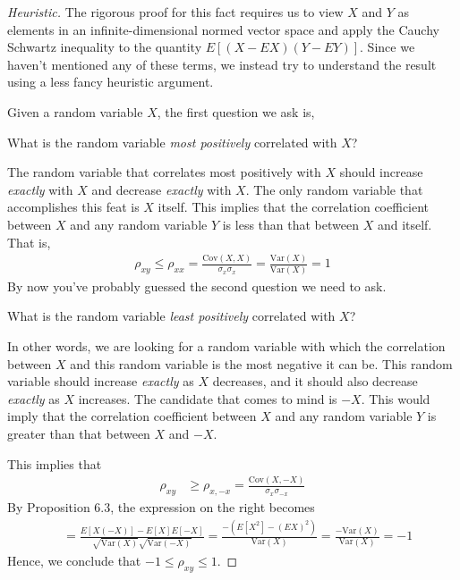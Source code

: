 \documentclass[11pt,letterpaper]{article}
\newcommand\var{\text{Var}}
\newcommand\cov{\text{Cov}}
\numberwithin{theorem}{section}
\numberwithin{definition}{section}
\numberwithin{lemma}{section}
\numberwithin{corollary}{section}
\numberwithin{proposition}{section}
\theoremstyle{definition}
\numberwithin{remark}{section}
\numberwithin{claim}{section}
\numberwithin{observation}{section}
\numberwithin{fact}{section}
\numberwithin{assumption}{section}
\numberwithin{example}{section}
\numberwithin{exercise}{section}
\begin{document}
\begin{proof}[Heuristic]
The rigorous proof for this fact requires us to view $X$ and $Y$ as elements in an infinite-dimensional normed vector space and apply the Cauchy Schwartz inequality to the quantity $E[(X-EX)(Y-EY)]$. Since we haven't mentioned any of these terms, we instead try to understand the result using a less fancy heuristic argument.

Given a random variable $X$, the first question we ask is, 
\begin{center}
What is the random variable \textit{most positively} correlated with $X$?
\end{center}
The random variable that correlates most positively with $X$ should increase \textit{exactly} with $X$ and decrease \textit{exactly} with $X$. The only random variable that accomplishes this feat is $X$ itself. This implies that the correlation coefficient between $X$ and any random variable $Y$ is less than that between $X$ and itself. That is,
\begin{align*}
\rho_{xy} \leq \rho_{xx} = \frac{\cov(X,X)}{\sigma_x \sigma_x} = \frac{\var(X)}{\var(X)} = 1
\end{align*}
By now you've probably guessed the second question we need to ask.
\begin{center}
What is the random variable \textit{least positively} correlated with $X$?
\end{center}
In other words, we are looking for a random variable with which the correlation between $X$ and this random variable is the most negative it can be. This random variable should increase \textit{exactly} as $X$ decreases, and it should also decrease \textit{exactly} as $X$ increases. The candidate that comes to mind is $-X$. This would imply that the correlation coefficient between $X$ and any random variable $Y$ is greater than that between $X$ and $-X$.

This implies that
\begin{align*}
\rho_{xy} &\geq \rho_{x,-x} = \frac{\cov(X,-X)}{\sigma_x \sigma_{-x}} 
\end{align*}
By Proposition 6.3, the expression on the right becomes
\begin{align*}
&= \frac{E[X(-X)] - E[X]E[-X]}{\sqrt{\var(X)} \sqrt{\var(-X)}} = \frac{-(E[X^2] - (EX)^2)}{\var(X)} = \frac{-\var(X)}{\var(X)} = -1
\end{align*}
Hence, we conclude that $-1 \leq \rho_{xy} \leq 1$.
\end{proof}
\end{document}
